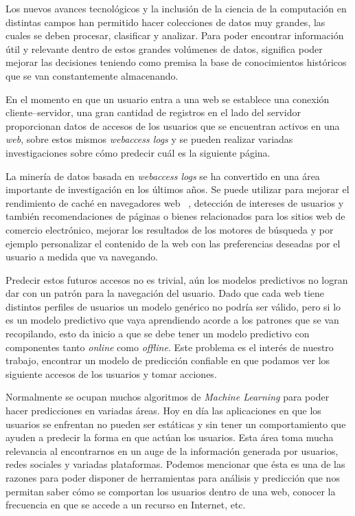 {

Los nuevos avances tecnológicos y la inclusión de la ciencia de la computación en distintas campos han permitido hacer colecciones de datos muy grandes, las cuales se deben procesar, clasificar y analizar. Para poder encontrar información útil y relevante dentro de estos grandes volúmenes de datos, significa poder mejorar las decisiones teniendo como premisa la base de conocimientos históricos que se van constantemente almacenando.

En el momento en que un usuario entra a una web se establece una conexión cliente--servidor, una gran cantidad de registros en el lado del servidor proporcionan datos de accesos de los usuarios que se encuentran activos en una \emph{web}, sobre estos mismos \emph{webaccess logs} y se pueden realizar variadas investigaciones sobre cómo predecir cuál es la siguiente página. 


La minería de datos basada en \emph{webaccess logs} se ha convertido en una área importante de investigación en los últimos años. Se puede utilizar para mejorar el rendimiento de caché en navegadores web \etal~\cite{Moghaddam2009},  detección de intereses de usuarios y también recomendaciones de páginas o bienes relacionados para los sitios web de comercio electrónico, mejorar los resultados de los motores de búsqueda y por ejemplo personalizar el contenido de la web con las preferencias deseadas por el usuario a medida que va navegando.

Predecir estos futuros accesos no es trivial, aún los modelos predictivos no logran dar con un patrón para la navegación del usuario. Dado que cada web tiene distintos perfiles de usuarios un modelo genérico no podría ser válido, pero si lo es un modelo predictivo que vaya aprendiendo acorde a los patrones que se van recopilando, esto da inicio a que se debe tener un modelo predictivo con componentes tanto \emph{online} como \emph{offline}. Este problema es el interés de nuestro trabajo, encontrar un modelo de predicción confiable en que podamos ver los siguiente accesos de los usuarios y tomar acciones. 

Normalmente se ocupan muchos algoritmos de \emph{Machine Learning} para poder hacer predicciones en variadas áreas. Hoy en día las aplicaciones en que los usuarios se enfrentan no pueden ser estáticas y sin tener un comportamiento que ayuden a predecir la forma en que actúan los usuarios. Esta área toma mucha relevancia al encontrarnos en un auge de la información generada por usuarios, redes sociales y variadas plataformas. Podemos mencionar que ésta es una de las razones para poder disponer de herramientas para análisis y predicción que nos permitan saber cómo se comportan los usuarios dentro de una web, conocer la frecuencia en que se accede a un recurso en Internet, etc. 


}
